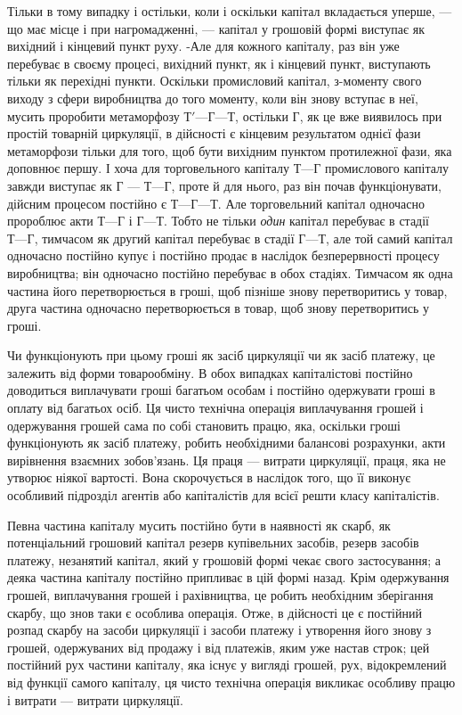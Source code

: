 Тільки в тому випадку і остільки, коли і оскільки капітал
вкладається уперше, — що має місце і при нагромадженні, — капітал
у грошовій формі виступає як вихідний і кінцевий пункт руху.
-Але для кожного капіталу, раз він уже перебуває в своєму
процесі, вихідний пункт, як і кінцевий пункт, виступають тільки
як перехідні пункти. Оскільки промисловий капітал, з-моменту
свого виходу з сфери виробництва до того моменту, коли він
знову вступає в неї, мусить проробити метаморфозу $Т' — Г — Т$,
остільки $Г$, як це вже виявилось при простій товарній
циркуляції, в дійсності є кінцевим результатом однієї фази метаморфози
тільки для того, щоб бути вихідним пунктом протилежної
фази, яка доповнює першу. І хоча для торговельного
капіталу $Т — Г$ промислового капіталу завжди виступає як $Г$ —
$Т — Г$, проте й для нього, раз він почав функціонувати, дійсним
процесом постійно є $Т — Г — Т$. Але торговельний капітал одночасно
пророблює акти $Т — Г$ і $Г — Т$. Тобто не тільки \emph{один} капітал
перебуває в стадії $Т — Г$, тимчасом як другий капітал
перебуває в стадії $Г — Т$, але той самий капітал одночасно постійно
купує і постійно продає в наслідок безперервності процесу
виробництва; він одночасно постійно перебуває в обох
стадіях. Тимчасом як одна частина його перетворюється в гроші,
щоб пізніше знову перетворитись у товар, друга частина одночасно
перетворюється в товар, щоб знову перетворитись у гроші.

Чи функціонують при цьому гроші як засіб циркуляції чи як
засіб платежу, це залежить від форми товарообміну. В обох випадках
капіталістові постійно доводиться виплачувати гроші багатьом
особам і постійно одержувати гроші в оплату від багатьох
осіб. Ця чисто технічна операція виплачування грошей і одержування
грошей сама по собі становить працю, яка, оскільки гроші
функціонують як засіб платежу, робить необхідними балансові
розрахунки, акти вирівнення взаємних зобов’язань. Ця праця —
витрати циркуляції, праця, яка не утворює ніякої вартості. Вона
скорочується в наслідок того, що її виконує особливий підрозділ
агентів або капіталістів для всієї решти класу капіталістів.

Певна частина капіталу мусить постійно бути в наявності
як скарб, як потенціальний грошовий капітал резерв купівельних
засобів, резерв засобів платежу, незанятий капітал, який у грошовій
формі чекає свого застосування; а деяка частина капіталу
постійно припливає в цій формі назад. Крім одержування грошей,
виплачування грошей і рахівництва, це робить необхідним
зберігання скарбу, що знов таки є особлива операція. Отже,
в дійсності це є постійний розпад скарбу на засоби циркуляції
і засоби платежу і утворення його знову з грошей, одержуваних
від продажу і від платежів, яким уже настав строк; цей постійний
рух частини капіталу, яка існує у вигляді грошей, рух, відокремлений
від функції самого капіталу, ця чисто технічна операція
викликає особливу працю і витрати — витрати циркуляції.

